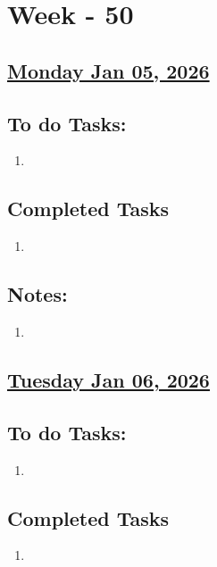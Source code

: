 \section{Week - 50}

\subsection*{\underline{Monday Jan 05, 2026}}
\subsection*{To do Tasks:}
\begin{enumerate}
    \item 
\end{enumerate}
\subsection*{Completed Tasks}
\begin{enumerate}[\ding{52}]  %
    \item 
\end{enumerate}
\subsection*{Notes:}
\begin{enumerate}
    \item 
\end{enumerate}
\subsection*{\underline{Tuesday Jan 06, 2026}}
\subsection*{To do Tasks:}
\begin{enumerate}
    \item  
\end{enumerate}
\subsection*{Completed Tasks}
\begin{enumerate}[\ding{52}]  %
    \item 
\end{enumerate}
